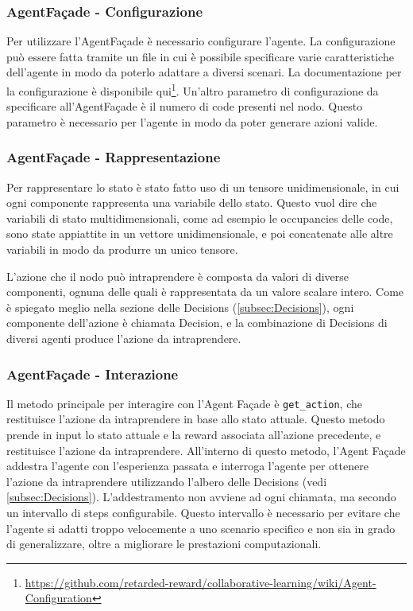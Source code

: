 \documentclass[conference]{IEEEtran}
\newcommand{\code}[1]{\texttt{#1}}
\begin{document}
\subsubsection{AgentFaçade - Configurazione} 
Per utilizzare l'AgentFaçade è necessario configurare l'agente. La configurazione può essere fatta tramite un file in cui è possibile specificare varie caratteristiche dell'agente in modo da poterlo adattare a diversi scenari. La documentazione per la configurazione è disponibile qui\footnote{\href{https://github.com/retarded-reward/collaborative-learning/wiki/Agent-Configuration}{https://github.com/retarded-reward/collaborative-learning/wiki/Agent-Configuration}}. Un'altro parametro di configurazione da specificare all'AgentFaçade è il numero di code presenti nel nodo. Questo parametro è necessario per l'agente in modo da poter generare azioni valide.
\subsubsection{AgentFaçade - Rappresentazione}
Per rappresentare lo stato è stato fatto uso di un tensore unidimensionale, in cui
ogni componente rappresenta una variabile dello stato. Questo vuol dire che variabili
di stato multidimensionali, come ad esempio le occupancies delle code, sono state
appiattite in un vettore unidimensionale, e poi concatenate alle altre variabili in modo
da produrre un unico tensore.

L'azione che il nodo può intraprendere è composta da valori di diverse componenti,
ognuna delle quali è rappresentata da un valore scalare intero. Come è spiegato meglio
nella sezione delle Decisions (\autoref{subsec:Decisions}), ogni componente dell'azione è chiamata Decision, e 
la combinazione di Decisions di diversi agenti produce l'azione da intraprendere.
\subsubsection{AgentFaçade - Interazione}
Il metodo principale per interagire con l'Agent Façade è \code{get\_action}, che restituisce l'azione da intraprendere in base allo stato attuale. Questo metodo prende in input lo stato attuale e la reward associata all'azione precedente, e restituisce l'azione da intraprendere. All'interno di questo metodo, l'Agent Façade addestra l'agente con l'esperienza passata e interroga l'agente per ottenere l'azione da intraprendere utilizzando l'albero delle Decisions  (vedi \autoref{subsec:Decisions}). L'addestramento non avviene ad ogni chiamata, ma secondo un intervallo di steps configurabile. Questo intervallo è necessario per evitare che l'agente si adatti troppo velocemente a uno scenario specifico e non sia in grado di generalizzare, oltre a migliorare le prestazioni computazionali.
\end{document}
